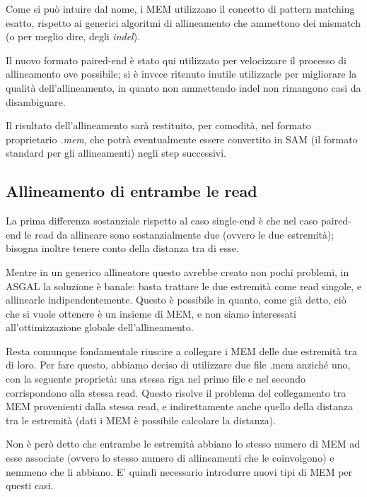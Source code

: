 Come si può intuire dal nome, i MEM utilizzano il concetto di pattern matching esatto, rispetto  ai generici algoritmi di allineamento che ammettono dei mismatch (o per meglio dire, degli \textit{indel}). 

Il nuovo formato paired-end è stato qui utilizzato per velocizzare il processo di allineamento ove possibile; si è invece ritenuto inutile utilizzarle per migliorare la qualità dell'allineamento, in quanto non ammettendo indel non rimangono casi da disambiguare.

Il risultato dell'allineamento sarà restituito, per comodità, nel formato proprietario \textit{.mem}, che potrà eventualmente essere convertito in SAM (il formato standard per gli allineamenti) negli step successivi.

\subsection{Allineamento di entrambe le read}
La prima differenza sostanziale rispetto al caso single-end è che nel caso paired-end le read da allineare sono sostanzialmente due (ovvero le due estremità); bisogna inoltre tenere conto della distanza tra di esse. 

Mentre in un generico allineatore questo avrebbe creato non pochi problemi, in ASGAL la soluzione è banale: basta trattare le due estremità come read singole, e allinearle indipendentemente. Questo è possibile in quanto, come già detto, ciò che si vuole ottenere è un insieme di MEM, e non siamo interessati all'ottimizzazione globale dell'allineamento. %

Resta comunque fondamentale riuscire a collegare i MEM delle due estremità tra di loro. Per fare questo, abbiamo deciso di utilizzare due file .mem anziché uno, con la seguente proprietà: una stessa riga nel primo file e nel secondo corrispondono alla stessa read. Questo risolve il problema del collegamento tra MEM provenienti dalla stessa read, e indirettamente anche quello della distanza tra le estremità (dati i MEM è possibile calcolare la distanza).

Non è però detto che entrambe le estremità abbiano lo stesso numero di MEM ad esse associate (ovvero lo stesso numero di allineamenti che le coinvolgono) e nemmeno che li abbiano. E' quindi necessario introdurre nuovi tipi di MEM per questi casi.


